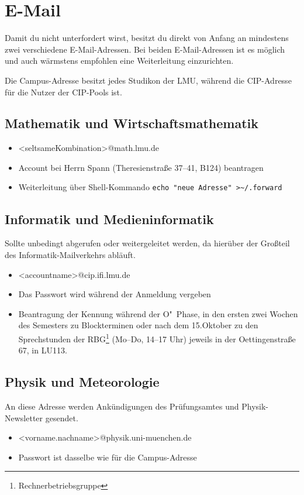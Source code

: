 \section{E-Mail}
Damit du nicht unterfordert wirst, besitzt du direkt von Anfang an mindestens zwei verschiedene E-Mail-Adressen. Bei beiden E-Mail-Adressen ist es möglich und auch wärmstens empfohlen eine Weiterleitung einzurichten.

Die Campus-Adresse besitzt jedes Studikon der LMU, während die CIP-Adresse für die Nutzer der CIP-Pools ist.


\subsection*{Mathematik und Wirtschaftsmathematik\subjectList{\subjectM\subjectW}}
\begin{itemize}
	\item <seltsameKombination>@math.lmu.de
	\item Account bei Herrn Spann (Theresienstraße 37--41, B124) beantragen
	\item Weiterleitung über Shell-Kommando \verb|echo "neue Adresse" >~/.forward|
\end{itemize}

\subsection*{Informatik und Medieninformatik \subjectList{\subjectI\subjectMI}}
Sollte unbedingt abgerufen oder weitergeleitet werden, da hierüber der Großteil des Informatik-Mailverkehrs abläuft. 
\begin{itemize}
	\item <accountname>@cip.ifi.lmu.de
	\item Das Passwort wird während der Anmeldung vergeben
	\item Beantragung der Kennung während der O"~Phase, in den ersten zwei Wochen des Semesters zu Blockterminen oder nach dem 15.Oktober zu den Sprechstunden der RBG\footnote{Rechnerbetriebsgruppe} 
		(Mo--Do, 14--17 Uhr) jeweils in der Oettingenstraße 67, in LU113.
\end{itemize}
\begin{urlList}
\end{urlList}

\subsection*{Physik und Meteorologie\subjectList{\subjectP}}
An diese Adresse werden Ankündigungen des Prüfungsamtes und
Physik-Newsletter gesendet.
\begin{itemize}
	\item <vorname.nachname>@physik.uni-muenchen.de
	\item Passwort ist dasselbe wie für die Campus-Adresse
\end{itemize}
\begin{urlList}
\end{urlList}

